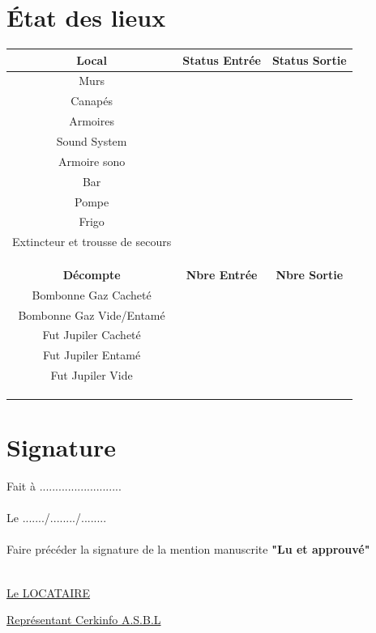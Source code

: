 \documentclass{article}
\begin{document}
\section*{État des lieux}
\begin{center}
\end{center}
\begin{center}
\begin{tabular}{ |c|c|c| } 
 \hline
 \textbf{Local} & \textbf{Status Entrée} & \textbf{Status Sortie} \\
 \hline
 Murs &  &  \\
 \hline
 Canapés &  &  \\
 \hline
 Armoires &  &  \\
 \hline
 Sound System &  &  \\
 \hline
 Armoire sono & & \\
 \hline
 Bar &  &  \\
 \hline
 Pompe &  &  \\
 \hline
 Frigo &  &  \\
 \hline
 Extincteur et trousse de secours &  &  \\
 \hline
  &  &  \\ 
  \hline
  &  &  \\ 
  \hline
  &  &  \\ 
 \hline
 \textbf{Décompte} & \textbf{Nbre Entrée} & \textbf{Nbre Sortie} \\
 \hline
 Bombonne Gaz Cacheté &  &  \\
 \hline
 Bombonne Gaz Vide/Entamé &  &  \\
 \hline
 Fut Jupiler Cacheté &  &  \\
 \hline
 Fut Jupiler Entamé &  &  \\
 \hline
 Fut Jupiler Vide &  &  \\
 \hline
  &  &  \\
 \hline
  &  &  \\
  \hline
  &  &  \\ 
 \hline
\end{tabular}
\end{center}

\section*{Signature}
Fait à .......................... \\\\
Le ......./......../........ \\\\
Faire précéder la signature de la mention manuscrite \textbf{"Lu et approuvé"}\\\\

\begin{minipage}{0.5\textwidth}
\underline{Le LOCATAIRE}
\end{minipage}
\begin{minipage}{0.5\textwidth}\raggedleft
\underline{Représentant Cerkinfo A.S.B.L}
\end{minipage}
\end{document}
